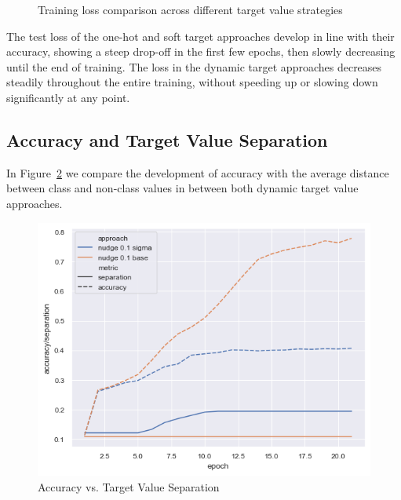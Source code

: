 \documentclass[12pt,fleqn,a4paper]{article}
\begin{document}
\begin{figure}[H]
\centering
{}
\hfill
{}
\caption{Training loss comparison across different target value strategies}
\label{fig:loss}
\end{figure}

The test loss of the one-hot and soft target approaches develop in line with their accuracy, showing a steep drop-off in the first few epochs, then slowly decreasing until the end of training. The loss in the dynamic target approaches decreases steadily throughout the entire training, without speeding up or slowing down significantly at any point.

\subsection{Accuracy and Target Value Separation}
In Figure~\ref{fig:accvsep} we compare the development of accuracy with the average distance between class and non-class values in between both dynamic target value approaches.

\begin{figure}[H]
    \centering
    \includegraphics[width=0.6\linewidth]{graphs/accvsep.png}
    \caption{Accuracy vs. Target Value Separation}
    \label{fig:accvsep}
\end{figure}
\end{document}
